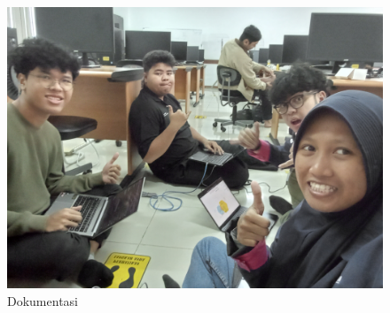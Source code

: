 \begin{figure}[htbp]
    \centering
    \includegraphics[width=0.5\linewidth]{dokum/IMG20250524100735.jpg} 
    \caption{Dokumentasi}
    \label{fig:dokumentasi}
\end{figure}
